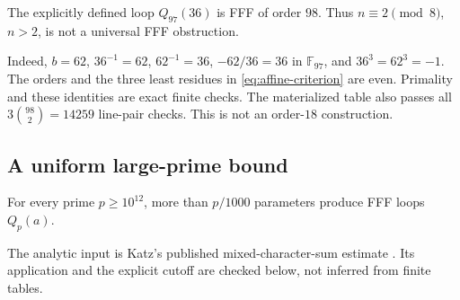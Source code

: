\begin{computationaltheorem}
\label{cthm:fff98}
The explicitly defined loop $Q_{97}(36)$ is FFF of order $98$.
Thus $n\equiv2\pmod8$, $n>2$, is not a universal FFF obstruction.
\end{computationaltheorem}

Indeed, $b=62$, $36^{-1}=62$, $62^{-1}=36$, $-62/36=36$ in
$\mathbb F_{97}$, and $36^3=62^3=-1$. The orders and the three
least residues in \eqref{eq:affine-criterion} are even.
Primality and these identities are exact finite checks.
The materialized table also passes all
$3\binom{98}{2}=14259$ line-pair checks. This is not an
order-$18$ construction.

\subsection{A uniform large-prime bound}

\begin{theorem}
\label{thm:affine-large-prime}
For every prime $p\geq10^{12}$, more than $p/1000$ parameters
produce FFF loops $Q_p(a)$.
\end{theorem}

The analytic input is Katz's published mixed-character-sum
estimate \cite[Theorem~1.5]{KatzMixed}. Its application and the
explicit cutoff are checked below, not inferred from finite tables.

